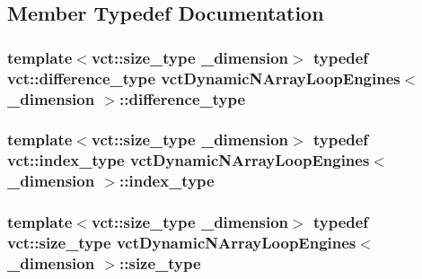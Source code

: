 \subsection{Member Typedef Documentation}
\hypertarget{classvct_dynamic_n_array_loop_engines_ae8d37731d603321cd52e0a6a6d13a017}{
\subsubsection[{difference\-\_\-type}]{\setlength{\rightskip}{0pt plus 5cm}template$<$vct\-::size\-\_\-type \-\_\-dimension$>$ typedef {\bf vct\-::difference\-\_\-type} {\bf vct\-Dynamic\-N\-Array\-Loop\-Engines}$<$ \-\_\-dimension $>$\-::{\bf difference\-\_\-type}}}\label{classvct_dynamic_n_array_loop_engines_ae8d37731d603321cd52e0a6a6d13a017}
\hypertarget{classvct_dynamic_n_array_loop_engines_a072f02e39fa5ce2bfeb95aa4164ce813}{
\subsubsection[{index\-\_\-type}]{\setlength{\rightskip}{0pt plus 5cm}template$<$vct\-::size\-\_\-type \-\_\-dimension$>$ typedef {\bf vct\-::index\-\_\-type} {\bf vct\-Dynamic\-N\-Array\-Loop\-Engines}$<$ \-\_\-dimension $>$\-::{\bf index\-\_\-type}}}\label{classvct_dynamic_n_array_loop_engines_a072f02e39fa5ce2bfeb95aa4164ce813}
\hypertarget{classvct_dynamic_n_array_loop_engines_ab1f5ac52c9289b164e4ca3d37c9c857c}{
\subsubsection[{size\-\_\-type}]{\setlength{\rightskip}{0pt plus 5cm}template$<$vct\-::size\-\_\-type \-\_\-dimension$>$ typedef {\bf vct\-::size\-\_\-type} {\bf vct\-Dynamic\-N\-Array\-Loop\-Engines}$<$ \-\_\-dimension $>$\-::{\bf size\-\_\-type}}}\label{classvct_dynamic_n_array_loop_engines_ab1f5ac52c9289b164e4ca3d37c9c857c}
